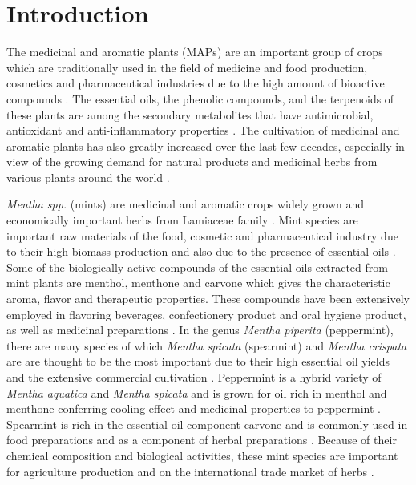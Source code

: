 \chapter{Introduction}

The medicinal and aromatic plants (MAPs) are an important group of crops which are traditionally used in the field of medicine and food production, cosmetics and pharmaceutical industries due to the high amount of bioactive compounds \parencite{Ahmad2020}. The essential oils, the phenolic compounds, and the terpenoids of these plants are among the secondary metabolites that have antimicrobial, antioxidant and anti-inflammatory properties \parencite{Ahmad2020}. The cultivation of medicinal and aromatic plants has also greatly increased over the last few decades, especially in view of the growing demand for natural products and medicinal herbs from various plants around the world \parencite{Ahmad2020}.

\textit{Mentha spp.} (mints) are medicinal and aromatic crops widely grown and economically important herbs from Lamiaceae family \parencite{Kalemba2019}. Mint species are important raw materials of the food, cosmetic and pharmaceutical industry due to their high biomass production and also due to the presence of essential oils \parencite{Zheljazkov2010}. Some of the biologically active compounds of the essential oils extracted from mint plants are menthol, menthone and carvone \textcite{Ahmad2020} which gives the characteristic aroma, flavor and therapeutic properties. These compounds have been extensively employed in flavoring beverages, confectionery product and oral hygiene product, as well as medicinal preparations \textcite{Ahmad2020}. In the genus \textit{Mentha piperita} (peppermint), there are many species of which \textit{Mentha spicata} (spearmint) and \textit{Mentha crispata} are are thought to be the most important due to their high essential oil yields and the extensive commercial cultivation \parencite{Kalemba2019}. Peppermint is a hybrid variety of \textit{Mentha aquatica} and \textit{Mentha spicata} and is grown for oil rich in menthol and menthone conferring cooling effect and medicinal properties to peppermint \textcite{Ahmad2020}. Spearmint is rich in the essential oil component carvone and is commonly used in food preparations and as a component of herbal preparations \parencite{Zheljazkov2010}. Because of their chemical composition and biological activities, these mint species are important for agriculture production and on the international trade market of herbs \textcite{Kalemba2019}.

